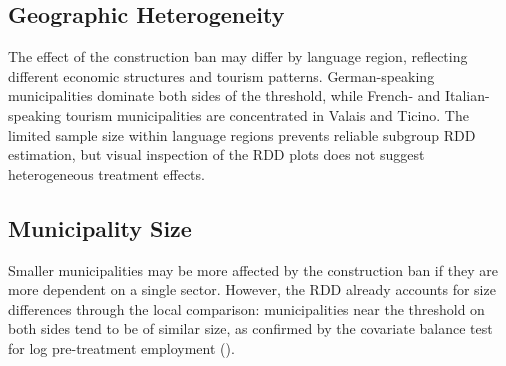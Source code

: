 \documentclass[12pt]{article}
\begin{document}
\subsection{Geographic Heterogeneity}

The effect of the construction ban may differ by language region, reflecting different economic structures and tourism patterns. German-speaking municipalities dominate both sides of the threshold, while French- and Italian-speaking tourism municipalities are concentrated in Valais and Ticino. The limited sample size within language regions prevents reliable subgroup RDD estimation, but visual inspection of the RDD plots does not suggest heterogeneous treatment effects.

\subsection{Municipality Size}

Smaller municipalities may be more affected by the construction ban if they are more dependent on a single sector. However, the RDD already accounts for size differences through the local comparison: municipalities near the threshold on both sides tend to be of similar size, as confirmed by the covariate balance test for log pre-treatment employment ().
\end{document}
